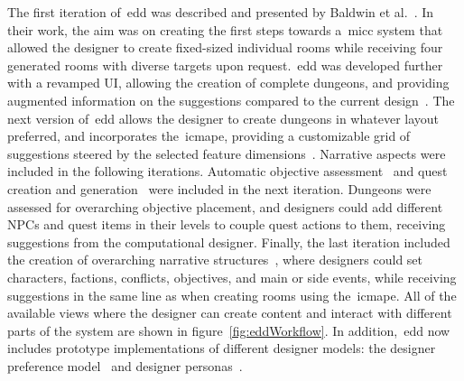 The first iteration of~\acrshort{edd} was described and presented by Baldwin et al.~\cite{baldwin_mixed-initiative_2017,baldwin_towards_2017}. In their work, the aim was on creating the first steps towards a~\acrshort{micc} system that allowed the designer to create fixed-sized individual rooms while receiving four generated rooms with diverse targets upon request.~\acrshort{edd} was developed further with a revamped UI, allowing the creation of complete dungeons, and providing augmented information on the suggestions compared to the current design~\cite{alvarez_fostering_2018,alvarez_assessing_2018}. The next version of~\acrshort{edd} allows the designer to create dungeons in whatever layout preferred, and incorporates the~\acrlong{icmape}, providing a customizable grid of suggestions steered by the selected feature dimensions~\cite{alvarez_empowering_2019,alvarez_interactive_2020}. Narrative aspects were included in the following iterations. Automatic objective assessment~\cite{flodhag_make_2020} and quest creation and generation~\cite{alvarez_questgram_2021,larsson_queststories_2021} were included in the next iteration. Dungeons were assessed for overarching objective placement, and designers could add different NPCs and quest items in their levels to couple quest actions to them, receiving suggestions from the computational designer. Finally, the last iteration included the creation of overarching narrative structures~\cite{alvarez_tropetwist_2022,alvarez_story_2022}, where designers could set characters, factions, conflicts, objectives, and main or side events, while receiving suggestions in the same line as when creating rooms using the~\acrshort{icmape}. All of the available views where the designer can create content and interact with different parts of the system are shown in figure~\ref{fig:eddWorkflow}. In addition,~\acrshort{edd} now includes prototype implementations of different designer models: the designer preference model~\cite{alvarez_exploring_2020} and designer personas~\cite{alvarez_designer_2022}.

